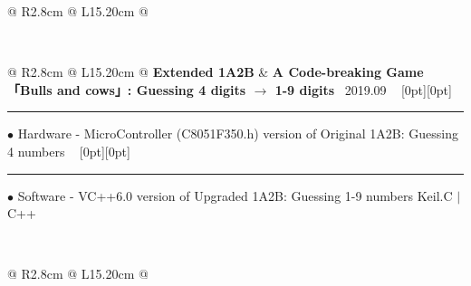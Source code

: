 {{\begin{tabularx}{\linewidth}{@{} R{2.8cm} @{\phantom{d}} L{15.20cm} @{}}
\end{tabularx}
\\
\begin{tabularx}{\linewidth}{@{} R{2.8cm} @{\phantom{d}} L{15.20cm} @{}}
	\textbf{Extended 1A2B} & \hspace{10pt} \textbf{A Code-breaking Game「Bulls and cows」: Guessing 4 digits $\to$ 1-9 digits} \hfill \textendash\ 2019.09 \newline \vspace{2pt} \ \hspace{-3pt} \raisebox{0.09\height}[0pt][0pt]{\vrule width0.5pt height30.0pt} \hspace{-0.30em}\rule[0.25em]{1.0em}{0.5pt}\!\! $\bullet$ {\small Hardware - MicroController (C8051F350.h) version of Original 1A2B: Guessing 4 numbers} \newline \vspace{-3pt} \ \hspace{-3pt} \raisebox{0.18\height}[0pt][0pt]{\vrule width0.5pt height14.5pt} \hspace{-0.30em}\rule[0.25em]{1.0em}{0.5pt}\!\! $\bullet$ {\small Software - VC++6.0 version of Upgraded 1A2B: Guessing 1-9 numbers} \hfill {\small \color{color-detail} Keil.C $|$ C++} \href{https://youtu.be/BiX5CQXVdPY}{\raisebox{-0.05\height}{\color{youtube_red!50}\faYoutube}} \href{https://github.com/ChenZhu-Xie/1A2B_3C_4A5B}{\color{black!50}\faGithub} \\ \Gap\Gap\Gap
\end{tabularx}
\\
\begin{tabularx}{\linewidth}{@{} R{2.8cm} @{\phantom{d}} L{15.20cm} @{}}

\end{tabularx}}}
